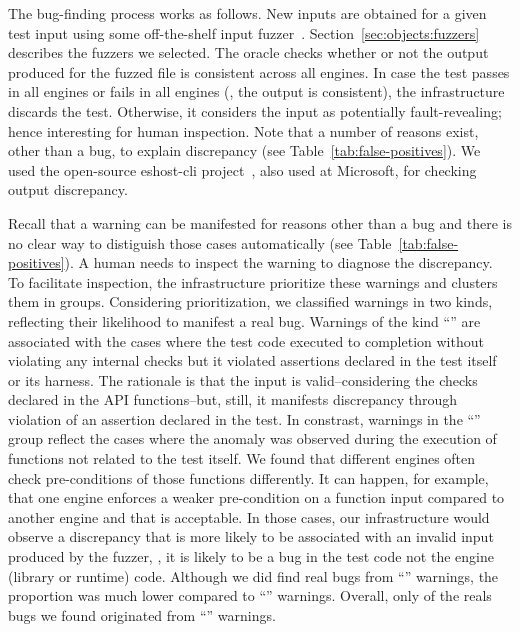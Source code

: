 \documentclass[10pt,conference,anonymous]{IEEEtran}
\begin{document}
The bug-finding process works as follows. New inputs are obtained for
a given test input using some off-the-shelf input
fuzzer~\cite{fuzz-testing-history}.
Section~\ref{sec:objects:fuzzers} describes the fuzzers we selected.
The oracle checks whether or not the output produced for the fuzzed
file is consistent across all engines. In case the test passes in all
engines or fails in all engines (\ie{}, the output is consistent), the
infrastructure discards the test. Otherwise, it considers the input as
potentially fault-revealing; hence interesting for human
inspection. Note that a number of reasons exist, other than a bug, to
explain discrepancy (see Table~\ref{tab:false-positives}). We used the
open-source eshost-cli project~\cite{eshost-cli}, also used at
Microsoft, for checking output discrepancy.


Recall that a warning can be manifested for reasons other than a bug
and there is no clear way to distiguish those cases automatically (see
Table~\ref{tab:false-positives}). A human needs to inspect the warning
to diagnose the discrepancy. To facilitate inspection, the
infrastructure prioritize these warnings and clusters them in
groups. Considering prioritization, we classified warnings in two
kinds, reflecting their likelihood to manifest a real bug. Warnings of
the kind ``\hi{}'' are associated with the cases where the test code
executed to completion without violating any internal checks but it
violated assertions declared in the test itself or its harness. The
rationale is that the input is valid--considering the checks declared
in the API functions--but, still, it manifests discrepancy through
violation of an assertion declared in the test. In constrast, warnings
in the ``\lo{}'' group reflect the cases where the anomaly was
observed during the execution of functions not related to the test
itself. We found that different engines often check pre-conditions of
those functions differently. It can happen, for example, that one
engine enforces a weaker pre-condition on a function input compared to
another engine and that is acceptable. In those cases, our infrastructure would
observe a discrepancy that is more likely to be associated with an
invalid input produced by the fuzzer, \ie{}, it is likely to be a bug
in the test code not the engine (library or runtime) code. Although we
did find real bugs from ``\lo{}'' warnings, the proportion was much
lower compared to ``\hi{}'' warnings. Overall, only  of the
reals bugs we found originated from ``\lo{}'' warnings.
\end{document}
